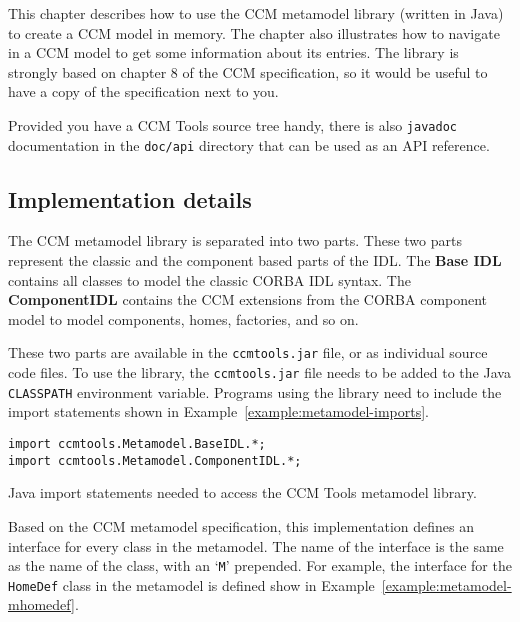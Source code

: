 This chapter describes how to use the CCM metamodel library (written in Java) to
create a CCM model in memory. The chapter also illustrates how to navigate in a
CCM model to get some information about its entries. The library is strongly
based on chapter 8 of the CCM specification, so it would be useful to have a
copy of the specification next to you.

Provided you have a CCM Tools source tree handy, there is also {\tt javadoc}
documentation in the {\tt doc/api} directory that can be used as an API
reference.

\subsection{Implementation details}

The CCM metamodel library is separated into two parts. These two parts represent
the classic and the component based parts of the IDL. The {\bf Base IDL}
contains all classes to model the classic CORBA IDL syntax. The {\bf
ComponentIDL} contains the CCM extensions from the CORBA component model to
model components, homes, factories, and so on.

These two parts are available in the {\tt ccmtools.jar} file, or as individual
source code files. To use the library, the {\tt ccmtools.jar} file needs to be
added to the Java {\tt CLASSPATH} environment variable. Programs using the
library need to include the import statements shown in
Example~\ref{example:metamodel-imports}.

\begin{Example}
\begin{minifbox}
\begin{small}
\begin{verbatim}
import ccmtools.Metamodel.BaseIDL.*;
import ccmtools.Metamodel.ComponentIDL.*;
\end{verbatim}
\end{small}
\end{minifbox}
\caption{Java import statements needed to access the CCM Tools metamodel
library.}
\label{example:metamodel-imports}
\end{Example}

Based on the CCM metamodel specification, this implementation defines an
interface for every class in the metamodel. The name of the interface is the
same as the name of the class, with an `{\tt M}' prepended. For example, the
interface for the {\tt HomeDef} class in the metamodel is defined show in
Example~\ref{example:metamodel-mhomedef}.

